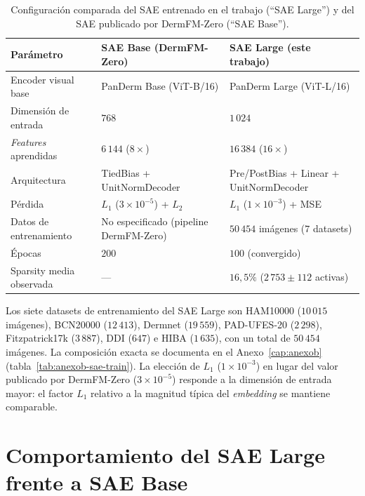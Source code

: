 \begin{table}[H]
\centering
\footnotesize
\setlength{\tabcolsep}{4pt}
\renewcommand{\arraystretch}{0.95}
\caption{Configuración comparada del SAE entrenado en el trabajo
(``SAE Large'') y del SAE publicado por DermFM-Zero
(``SAE Base'').}
\label{tab:anexof-config}
\begin{tabular}{lll}
\hline
Parámetro                  & SAE Base (DermFM-Zero)             & SAE Large (este trabajo) \\
\hline
Encoder visual base        & PanDerm Base (ViT-B/16)            & PanDerm Large (ViT-L/16) \\
Dimensión de entrada       & $768$                              & $1\,024$ \\
\emph{Features} aprendidas & $6\,144$ ($8\times$)               & $16\,384$ ($16\times$) \\
Arquitectura               & TiedBias + UnitNormDecoder         & Pre/PostBias + Linear + UnitNormDecoder \\
Pérdida                    & $L_1$ ($3\times 10^{-5}$) + $L_2$  & $L_1$ ($1\times 10^{-3}$) + MSE \\
Datos de entrenamiento     & No especificado (pipeline DermFM-Zero) & $50\,454$ imágenes ($7$ datasets) \\
Épocas                     & $200$                              & $100$ (convergido) \\
Sparsity media observada   & ---                                & $16{,}5\%$ ($2\,753 \pm 112$ activas) \\
\hline
\end{tabular}
\end{table}

Los siete datasets de entrenamiento del SAE Large son HAM10000
($10\,015$ imágenes), BCN20000 ($12\,413$),
Dermnet ($19\,559$), PAD-UFES-20 ($2\,298$),
Fitzpatrick17k ($3\,887$), DDI ($647$) e HIBA
($1\,635$), con un total de $50\,454$ imágenes. La
composición exacta se documenta en el Anexo~\ref{cap:anexob}
(tabla~\ref{tab:anexob-sae-train}). La elección de
$L_1$ ($1\times 10^{-3}$) en lugar del valor publicado por
DermFM-Zero ($3\times 10^{-5}$) responde a la dimensión de entrada
mayor: el factor $L_1$ relativo a la magnitud típica del
\emph{embedding} se mantiene comparable.

\section{Comportamiento del SAE Large frente a SAE Base}
\label{sec:anexof-comparacion}

